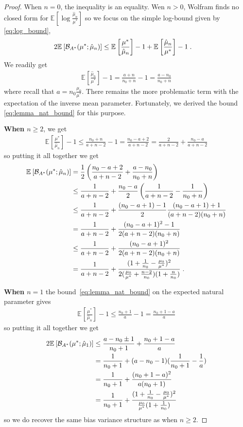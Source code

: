 \documentclass{article}
\newcommand*{\expect}[2][]{\ensuremath{\mathbb{E}_{#1} \left[ #2 \right] }} %
\newcommand{\logpart}{A}
\newcommand{\bregmanconj}{\cB_{\logpart^*}}
\newcommand{\MAPm}{\hat \mu_n}
\begin{document}
\begin{proof}
When $n=0$, the inequality is an equality. 
Wen $n>0$, Wolfram finds no closed form for $\expect{\log\frac{\MAPm}{\mu^*}}$ so we focus on the simple log-bound given by \eqref{eq:log_bound},
\begin{align}
	2\expect{\bregmanconj(\mu^*; \MAPm)} 
	&\leq \expect{\frac{\mu^*}{\MAPm}} -1  + \expect{\frac{\MAPm}{\mu^*}} - 1 \; .
\end{align}
We readily get 
\begin{align}
	 \expect{\frac{\MAPm}{\mu^*}} - 1 = \frac{a+n}{n_0+n} - 1 = \frac{a - n_0}{n_0+n}
\end{align}
where recall that $a=n_0\frac{\mu_0}{\mu^*}$. 
There remains the more problematic term with the expectation of the inverse mean parameter.
Fortunately, we derived the bound \eqref{eq:lemma_nat_bound} for this purpose.

\textbf{When $n\geq 2$}, we get 
\begin{align}
	\expect{\frac{\mu^*}{\MAPm}} - 1 
	\leq \frac{n_0 + n}{a +n - 2} -1
	= \frac{n_0 - a + 2}{a +n - 2}
	 = \frac{2}{a +n - 2} + \frac{n_0 - a}{a +n - 2}
\end{align}
so putting it all together we get 
\begin{align}
	\expect{\bregmanconj(\mu^*; \MAPm)} 
	& = \half \left(\frac{n_0 - a + 2}{a +n - 2}  + \frac{a - n_0}{n_0+n} \right )\\
	&\leq \frac{1}{a+n-2} + \frac{n_0-a}{2}  \left( \inv{a+n-2} - \inv{n_0+n} \right)\\
	&\leq \frac{1}{a+n-2} + \frac{(n_0-a + 1) - 1}{2}  \frac{(n_0 - a + 1) + 1}{(a+n-2)(n_0+n)} \\
	&= \frac{1}{a+n-2} + \frac{(n_0 - a +1)^2 - 1}{2(a+n-2)(n_0+n)} \\
	&\leq \frac{1}{a+n-2} + \frac{(n_0 - a +1)^2}{2(a+n-2)(n_0 + n)} \\
	&= \frac{1}{a+n-2} + \frac{(1 + \inv{n_0} - \frac{\mu_0}{\mu^*})^2}{2 (\frac{\mu_0}{\mu^*}+\frac{n-2}{n_0})(1 + \frac{n}{n_0} )} \; .
\end{align}

\textbf{When $n=1$} the bound~\eqref{eq:lemma_nat_bound}  on the expected natural parameter gives
\begin{align}
	\expect{\frac{\mu^*}{\MAPm}} - 1 
	\leq \frac{n_0 + 1}{a} -1
	= \frac{n_0 +1 - a}{a}
\end{align}
so putting it all together we get
\begin{align}
	2\expect{\bregmanconj(\mu^*; \hat \mu_1)} 
	&\leq \frac{a - n_0 \pm 1}{n_0 + 1}  + \frac{n_0 +1 - a }{a} \\
	& = \inv{n_0+1}  + ( a - n_0 - 1)(\inv{n_0+1} - \inv{a}) \\
	& = \inv{n_0+1}  + \frac{(n_0 + 1 -a)^2}{a(n_0+1)}\\
	&= \inv{n_0+1}  + \frac{(1 + \inv{n_0} - \frac{\mu_0}{\mu^*})^2}{\frac{\mu_0}{\mu^*}(1 + \inv{n_0} )} 
\end{align}
so we do recover the same bias variance structure as when $n\geq2$.
\end{proof}
\end{document}
